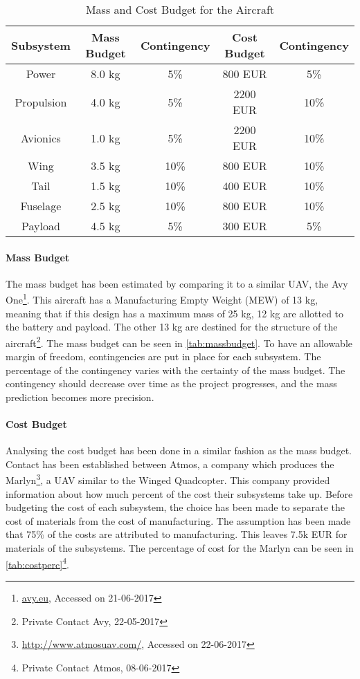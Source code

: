 \begin{table}[H]
    \centering
    \caption{Mass and Cost Budget for the Aircraft}
    \label{tab:massbudget}
    \begin{tabular}{ccccc} \toprule
    
    
    
    \bfseries Subsystem     & \bfseries Mass Budget &\bfseries Contingency & \bfseries Cost Budget &\bfseries  Contingency \\ \midrule
    Power     & 8.0 kg & 5\% & 800 EUR& 5\%  \\
    Propulsion & 4.0 kg & 5\% & 2200 EUR& 10\% \\
    Avionics & 1.0 kg & 5\% & 2200 EUR & 10\% \\
    Wing & 3.5 kg & 10\% & 800 EUR& 10\% \\
    Tail & 1.5 kg & 10\% & 400 EUR& 10\% \\
    Fuselage & 2.5 kg & 10\% & 800 EUR& 10\% \\
    Payload & 4.5 kg & 5\% & 300 EUR& 5\% \\ \bottomrule
    \end{tabular}
\end{table}


\paragraph{Mass Budget}
The mass budget has been estimated by comparing it to a similar UAV, the Avy One\footnote{\url{avy.eu}, Accessed on 21-06-2017}. This aircraft has a Manufacturing Empty Weight (MEW) of 13 kg, meaning that if this design has a maximum mass of 25 kg, 12 kg are allotted to the battery and payload. The other 13 kg are destined for the structure of the aircraft\footnote{Private Contact Avy, 22-05-2017}. The mass budget can be seen in \autoref{tab:massbudget}. To have an allowable margin of freedom, contingencies are put in place for each subsystem. The percentage of the contingency varies with the certainty of the mass budget. The contingency should decrease over time as the project progresses, and the mass prediction becomes more precision.

\paragraph{Cost Budget}
Analysing the cost budget has been done in a similar fashion as the mass budget. Contact has been established between Atmos, a company which produces the Marlyn\footnote{\url{http://www.atmosuav.com/}, Accessed on 22-06-2017}, a UAV similar to the Winged Quadcopter. This company provided information about how much percent of the cost their subsystems take up. Before budgeting the cost of each subsystem, the choice has been made to separate the cost of materials from the cost of manufacturing. The assumption has been made that 75\% of the costs are attributed to manufacturing. This leaves 7.5k EUR for materials of the subsystems. The percentage of cost for the Marlyn can be seen in \autoref{tab:costperc}\footnote{Private Contact Atmos, 08-06-2017}.

